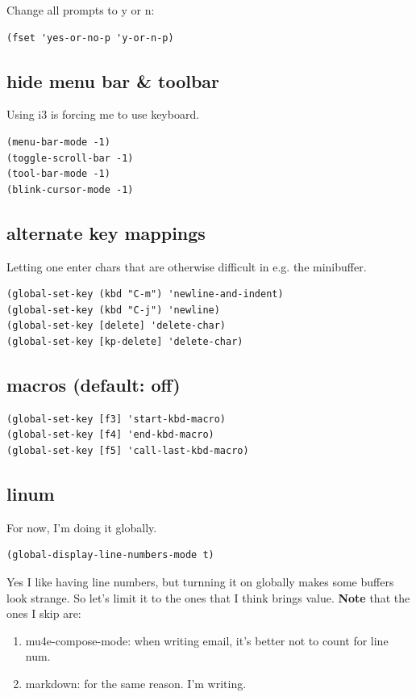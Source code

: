 \documentclass[11pt]{article}
\begin{document}
Change all prompts to y or n:

\begin{verbatim}
(fset 'yes-or-no-p 'y-or-n-p)
\end{verbatim}

\subsection{hide menu bar \& toolbar}
\label{sec:org603270b}
Using i3 is forcing me to use keyboard.

\begin{verbatim}
(menu-bar-mode -1)
(toggle-scroll-bar -1)
(tool-bar-mode -1)
(blink-cursor-mode -1)
\end{verbatim}
\subsection{alternate key mappings}
\label{sec:org08dfc72}

Letting one enter chars that are otherwise difficult in e.g. the
minibuffer.

\begin{verbatim}
(global-set-key (kbd "C-m") 'newline-and-indent)
(global-set-key (kbd "C-j") 'newline)
(global-set-key [delete] 'delete-char)
(global-set-key [kp-delete] 'delete-char)
\end{verbatim}
\subsection{macros (default: off)}
\label{sec:orgca7034a}
\begin{verbatim}
(global-set-key [f3] 'start-kbd-macro)
(global-set-key [f4] 'end-kbd-macro)
(global-set-key [f5] 'call-last-kbd-macro)
\end{verbatim}
\subsection{linum}
\label{sec:org09d3715}

For now, I'm doing it globally.

\begin{verbatim}
(global-display-line-numbers-mode t)
\end{verbatim}


Yes I like having line numbers, but turnning it on globally makes some
buffers look strange. So let's limit it to the ones that I think
brings value. \textbf{Note} that the ones I skip are:

\begin{enumerate}
\item mu4e-compose-mode: when writing email, it's better not to count for line num.
\item markdown: for the same reason. I'm writing.
\end{enumerate}
\end{document}
